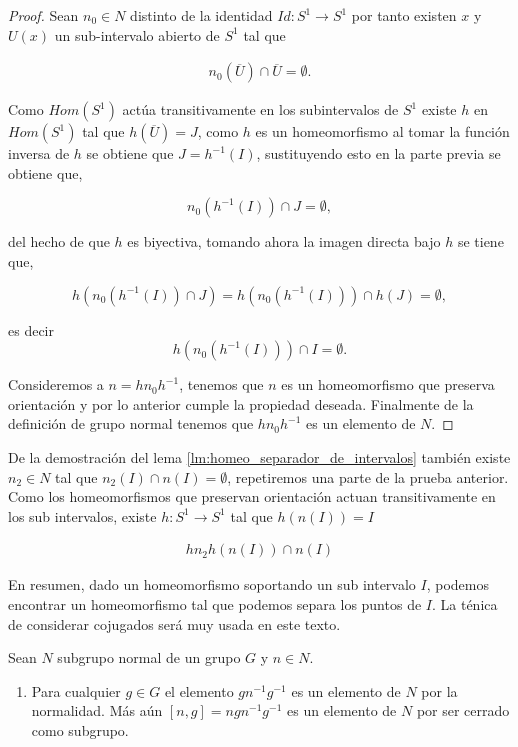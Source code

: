 \begin{proof}
Sean  $n_0 \in N$ distinto de la identidad $Id: S^1 \to S^1$ por tanto existen $x$ y $U(x)$ un sub-intervalo abierto de $S^1$ tal que 

\begin{align*}
n_0(\overline{U}) \cap \overline{U} =\emptyset.
\end{align*}

Como $Hom(S^1)$ actúa transitivamente en los subintervalos de  $S^1$ existe $h$ en $Hom(S^1)$ tal que $h(\overline{U}) =J$, como $h$ es un homeomorfismo al tomar la función inversa de $h$ se obtiene que $J=h^{-1}(I)$, sustituyendo esto en la parte previa se obtiene que,

$$n_0(h^{-1}(I)) \cap J= \emptyset,$$

del hecho de que $h$ es biyectiva, tomando ahora la imagen directa bajo $h$ se tiene que,

$$h(n_0(h^{-1}(I)) \cap J)=h(n_0(h^{-1}(I))) \cap h(J)= \emptyset,$$

es decir 
$$h(n_0(h^{-1}(I))) \cap I= \emptyset.$$

Consideremos a $n=hn_0h^{-1}$, tenemos que $n$ es un homeomorfismo que preserva orientación y por lo anterior cumple la propiedad deseada. Finalmente de la  definición de grupo normal tenemos que $hn_0h^{-1}$ es un elemento de  $N$.


\end{proof}

\begin{ob}
De la demostración del lema \ref{lm:homeo_separador_de_intervalos}
también existe $n_2 \in N$ tal que $n_2(I) \cap n(I)= \emptyset$, repetiremos una parte de la prueba anterior. Como los homeomorfismos que preservan orientación actuan transitivamente en los sub intervalos, existe $h: S^1 \to S^1$ tal que $h(n(I))=I$

\begin{align*}
hn_2h(n(I))\cap n(I)
\end{align*}
\end{ob}
En resumen, dado un homeomorfismo soportando un sub intervalo $I$, podemos encontrar un homeomorfismo tal que podemos separa los  puntos de $I$. La ténica de considerar cojugados será muy usada en este texto.  

\begin{ob}
Sean $N$ subgrupo normal de un grupo $G$ y $n \in N$.
\begin{enumerate}
	\item Para cualquier $g \in G$ el elemento $gn^{-1}g^{-1}$ es un elemento de $N$ por la normalidad. Más aún $[n,g]=ngn^{-1}g^{-1}$ es un elemento de $N$ por ser cerrado como subgrupo.
\end{enumerate}
\end{ob}



